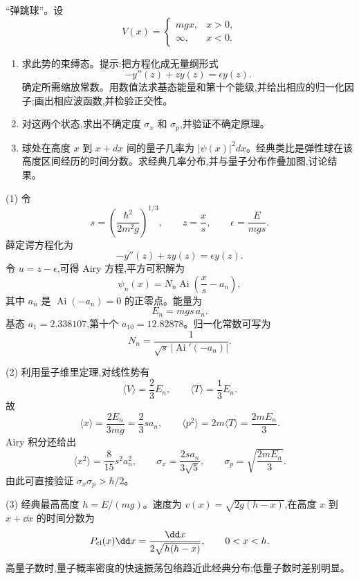 \begin{question}
“弹跳球”。设
\[
V(x)=\begin{cases}mgx,&x>0,\\ \infty,&x<0.
\end{cases}
\]
\begin{enumerate}
\item 求此势的束缚态。提示:把方程化成无量纲形式
\[
-y''(z)+zy(z)=\epsilon y(z).
\]
确定所需缩放常数。用数值法求基态能量和第十个能级,并给出相应的归一化因子;画出相应波函数,并检验正交性。
\item 对这两个状态,求出不确定度 $\sigma_x$ 和 $\sigma_p$,并验证不确定原理。
\item 球处在高度 $x$ 到 $x+dx$ 间的量子几率为 $|\psi(x)|^2dx$。经典类比是弹性球在该高度区间经历的时间分数。求经典几率分布,并与量子分布作叠加图,讨论结果。
\end{enumerate}
\begin{solution}
(1) 令
\[
s=\left(\frac{\hbar^2}{2m^2g}\right)^{1/3},
\qquad
z=\frac{x}{s},
\qquad
\epsilon=\frac{E}{mgs}.
\]
薛定谔方程化为
\[
-y''(z)+zy(z)=\epsilon y(z).
\]
令 $u=z-\epsilon$,可得 Airy 方程,平方可积解为
\[
\psi_n(x)=N_n\operatorname{Ai}\left(\frac{x}{s}-a_n\right),
\]
其中 $a_n$ 是 $\operatorname{Ai}(-a_n)=0$ 的正零点。能量为
\[
E_n=mgs\,a_n.
\]
基态 $a_1=2.338107$,第十个 $a_{10}=12.82878$。归一化常数可写为
\[
N_n=\frac1{\sqrt{s}\,|\operatorname{Ai}'(-a_n)|}.
\]

(2) 利用量子维里定理,对线性势有
\[
\langle V\rangle=\frac23E_n,
\qquad
\langle T\rangle=\frac13E_n.
\]
故
\[
\langle x\rangle=\frac{2E_n}{3mg}=\frac23sa_n,
\qquad
\langle p^2\rangle=2m\langle T\rangle=\frac{2mE_n}{3}.
\]
Airy 积分还给出
\[
\langle x^2\rangle=\frac{8}{15}s^2a_n^2,
\qquad
\sigma_x=\frac{2sa_n}{3\sqrt5},
\qquad
\sigma_p=\sqrt{\frac{2mE_n}{3}}.
\]
由此可直接验证 $\sigma_x\sigma_p>\hbar/2$。

(3) 经典最高高度 $h=E/(mg)$。速度为 $v(x)=\sqrt{2g(h-x)}$,在高度 $x$ 到 $x+\dd x$ 的时间分数为
\[
P_{\rm cl}(x)\dd x=\frac{\dd x}{2\sqrt{h(h-x)}},
\qquad 0<x<h.
\]
高量子数时,量子概率密度的快速振荡包络趋近此经典分布;低量子数时差别明显。
\end{solution}
\end{question}

